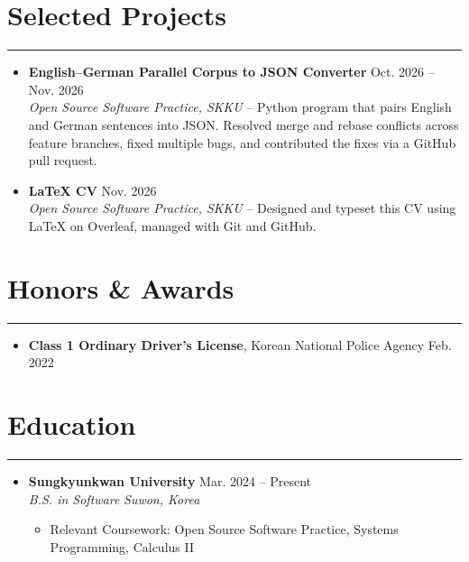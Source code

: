 \documentclass[letterpaper, 10pt]{article}
\begin{document}
\section*{Selected Projects}
\hrule
\vspace{4pt}
\begin{itemize}
    \item \textbf{English--German Parallel Corpus to JSON Converter} \hfill Oct. 2026 -- Nov. 2026 \\
    \textit{Open Source Software Practice, SKKU} -- Python program that pairs English and German sentences into JSON. Resolved merge and rebase conflicts across feature branches, fixed multiple bugs, and contributed the fixes via a GitHub pull request.
    \item \textbf{LaTeX CV} \hfill Nov. 2026 \\
    \textit{Open Source Software Practice, SKKU} -- Designed and typeset this CV using \LaTeX{} on Overleaf, managed with Git and GitHub.
\end{itemize}

\section*{Honors \& Awards}
\hrule
\vspace{4pt}
\begin{itemize}
    \item \textbf{Class 1 Ordinary Driver's License}, Korean National Police Agency \hfill Feb. 2022
\end{itemize}

\section*{Education}
\hrule
\vspace{4pt}
\begin{itemize}
    \item[]
        \textbf{Sungkyunkwan University} \hfill Mar. 2024 -- Present \\
        \textit{B.S. in Software} \hfill \textit{Suwon, Korea}
        \begin{itemize}
            \item Relevant Coursework: Open Source Software Practice, Systems Programming, Calculus II
        \end{itemize}
\end{itemize}

\end{document}
